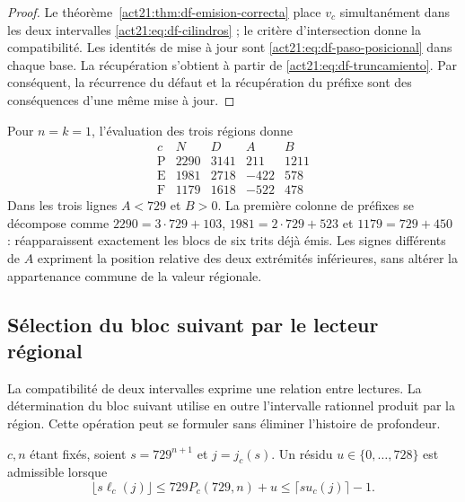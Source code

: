 \begin{proof}
Le théorème~\ref{act21:thm:df-emision-correcta} place \(v_c\) simultanément dans
les deux intervalles \eqref{act21:eq:df-cilindros} ; le critère d'intersection donne
la compatibilité. Les identités de mise à jour sont
\eqref{act21:eq:df-paso-posicional} dans chaque base. La récupération s'obtient à partir de
\eqref{act21:eq:df-truncamiento}. Par conséquent, la récurrence du défaut et la
récupération du préfixe sont des conséquences d'une même mise à jour.
\end{proof}

\begin{example}
Pour \(n=k=1\), l'évaluation des trois régions donne
\[
\begin{array}{c|rr|rr}
 c&N&D&A&B\\\hline
 \mathrm P&2290&3141&211&1211\\
 \mathrm E&1981&2718&-422&578\\
 \mathrm F&1179&1618&-522&478
\end{array}
\]
Dans les trois lignes \(A<729\) et \(B>0\). La première colonne de préfixes
se décompose comme \(2290=3\cdot729+103\),
\(1981=2\cdot729+523\) et \(1179=729+450\) : réapparaissent exactement les
blocs de six trits déjà émis. Les signes différents de \(A\) expriment
la position relative des deux extrémités inférieures, sans altérer la
appartenance commune de la valeur régionale.
\end{example}

\subsection{Sélection du bloc suivant par le lecteur régional}

La compatibilité de deux intervalles exprime une relation entre lectures. La détermination du bloc suivant utilise en outre l'intervalle rationnel produit par la région. Cette opération peut se formuler sans éliminer l'histoire de profondeur.

\begin{definition}
\(c,n\) étant fixés, soient \(s=729^{n+1}\) et \(j=j_c(s)\). Un résidu
\(u\in\{0,\ldots,728\}\) est admissible lorsque
\begin{equation}
 \lfloor s\ell_c(j)\rfloor
 \leq729P_c(729,n)+u
 \leq\lceil su_c(j)\rceil-1.
 \label{act21:eq:df-admisibilidad}
\end{equation}
\end{definition}

